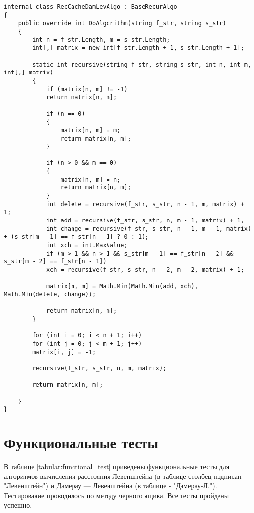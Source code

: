 \begin{lstlisting}[label=lst:damlevcache,caption=Класс с алгоритмом нахождения расстояния Левенштейна с использованием рекурсии.]
internal class RecCacheDamLevAlgo : BaseRecurAlgo
{
	public override int DoAlgorithm(string f_str, string s_str)
	{
		int n = f_str.Length, m = s_str.Length;
		int[,] matrix = new int[f_str.Length + 1, s_str.Length + 1];
		
		static int recursive(string f_str, string s_str, int n, int m, int[,] matrix)
		{
			if (matrix[n, m] != -1)
			return matrix[n, m];
			
			if (n == 0)
			{
				matrix[n, m] = m;
				return matrix[n, m];
			}
			
			if (n > 0 && m == 0)
			{
				matrix[n, m] = n;
				return matrix[n, m];
			}
			int delete = recursive(f_str, s_str, n - 1, m, matrix) + 1;
			int add = recursive(f_str, s_str, n, m - 1, matrix) + 1;
			int change = recursive(f_str, s_str, n - 1, m - 1, matrix) + (s_str[m - 1] == f_str[n - 1] ? 0 : 1);
			int xch = int.MaxValue;
			if (m > 1 && n > 1 && s_str[m - 1] == f_str[n - 2] && s_str[m - 2] == f_str[n - 1])
			xch = recursive(f_str, s_str, n - 2, m - 2, matrix) + 1;
			
			matrix[n, m] = Math.Min(Math.Min(add, xch), Math.Min(delete, change));
			
			return matrix[n, m];
		}
		
		for (int i = 0; i < n + 1; i++)
		for (int j = 0; j < m + 1; j++)
		matrix[i, j] = -1;
		
		recursive(f_str, s_str, n, m, matrix);
		
		return matrix[n, m];
		
	}
}
\end{lstlisting}

\section{Функциональные тесты}
В таблице \ref{tabular:functional_test} приведены функциональные тесты для алгоритмов вычисления расстояния Левенштейна (в таблице столбец подписан "Левенштейн") и Дамерау — Левенштейна (в таблице - "Дамерау-Л."). Тестирование проводилось по методу черного ящика. Все тесты пройдены успешно.


